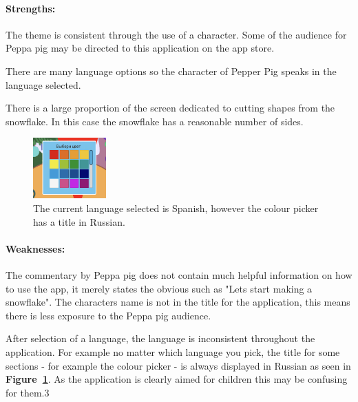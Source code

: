 \documentclass[11pt]{article}
\begin{document}
                \paragraph{Strengths:}
                The theme is consistent through the use of a character. Some of the audience for Peppa pig may be directed to this application on the app store. 
                
                There are many language options so the character of Pepper Pig speaks in the language selected.
                
                There is a large proportion of the screen dedicated to cutting shapes from the snowflake. In this case the snowflake has a reasonable number of sides. 

                \begin{figure}
                    \includegraphics[width=0.25\textwidth]{Images/peppa/peppaRussian.png}
                    \caption{The current language selected is Spanish, however the colour picker has a title in Russian.}
                    \label{fig:peppaRussian}
                \end{figure}
                \paragraph{Weaknesses:}
                
                The commentary by Peppa pig does not contain much helpful information on how to use the app, it merely states the obvious such as "Lets start making a snowflake". The characters name is not in the title for the application, this means there is less exposure to the Peppa pig audience.
                
                After selection of a language, the language is inconsistent throughout the application. For example no matter which language you pick, the title for some sections - for example the colour picker - is always displayed in Russian as seen in \textbf{Figure~\ref{fig:peppaRussian}}.  As the application is clearly aimed for children this may be confusing for them.3
                
\end{document}
